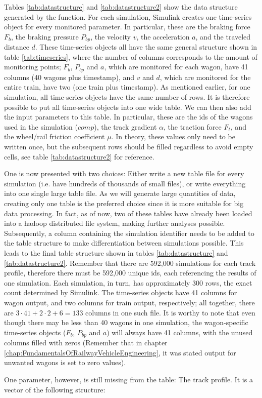 \par\noindent
Tables \ref{tab:datastructure} and \ref{tab:datastructure2} show the data structure generated by the  function. For each simulation, Simulink creates one time-series object for every monitored parameter. In particular, these are the braking force $F_{b}$, the braking pressure $P_{bp}$, the velocity $v$, the acceleration $a$, and the traveled distance $d$. These time-series objects all have the same general structure shown in table \ref{tab:timeseries}, where the number of columns corresponds to the amount of monitoring points; $F_{b}$, $P_{bp}$ and $a$, which are monitored for each wagon, have 41 columns (40 wagons plus timestamp), and $v$ and $d$, which are monitored for the entire train, have two (one train plus timestamp). As mentioned earlier, for one simulation, all time-series objects have the same number of rows. It is therefore possible to put all time-series objects into one wide table. We can then also add the input parameters to this table. In particular, these are the ids of the wagons used in the simulation ($comp$), the track gradient $\alpha$, the traction force $F_{t}$, and the wheel/rail friction coefficient $\mu$. In theory, these values only need to be written once, but the subsequent rows should be filled regardless to avoid empty cells, see table \ref{tab:datastructure2} for reference. 
\par
One is now presented with two choices: Either write a new table file for every simulation (i.e. have hundreds of thousands of small files), or write everything into one single large table file. As we will generate large quantities of data, creating only one table is the preferred choice since it is more suitable for big data processing. In fact, as of now, two of these tables have already been loaded into a hadoop distributed file system, making further analyses possible. Subsequently, a column containing the simulation identifier needs to be added to the table structure to make differentiation between simulations possible. This leads to the final table structure shown in tables \ref{tab:datastructure} and \ref{tab:datastructure2}. Remember that there are 592,000 simulations for each track profile, therefore there must be 592,000 unique ids, each referencing the results of one simulation. Each simulation, in turn, has approximately 300 rows, the exact count determined by Simulink. The time-series objects have 41 columns for wagon output, and two columns for train output, respectively; all together, there are $3 \cdot 41 + 2 \cdot 2 + 6 = 133$ columns in one such file. It is worthy to note that even though there may be less than 40 wagons in one simulation, the wagon-specific time-series objects ($F_{b}$, $P_{bp}$ and $a$) will always have 41 columns, with the unused columns filled with zeros (Remember that in chapter \ref{chap:FundamentalsOfRailwayVehicleEngineering}, it was stated output for unwanted wagons is set to zero values).
\par
One parameter, however, is still missing from the table: The track profile. It is a vector of the following structure:

